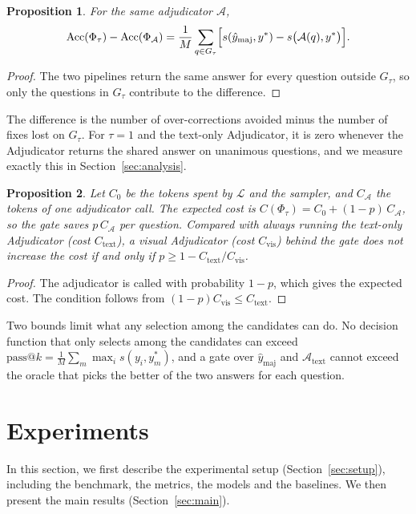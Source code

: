 \documentclass[pdflatex,sn-basic]{sn-jnl}%
\theoremstyle{thmstyletwo}%
\newtheorem{proposition}{Proposition}%
\begin{document}
\begin{proposition}
\label{prop:acc}
For the same adjudicator $\mathcal{A}$,
\[
\mathrm{Acc}(\Phi_\tau)-\mathrm{Acc}(\Phi_{\mathcal{A}})=\frac{1}{M}\sum_{q\in G_\tau}\Bigl[s(\hat y_{\mathrm{maj}},y^\ast)-s\bigl(\mathcal{A}(q),y^\ast\bigr)\Bigr].
\]
\end{proposition}
\begin{proof}
The two pipelines return the same answer for every question outside $G_\tau$, so only the questions in $G_\tau$ contribute to the difference.
\end{proof}

The difference is the number of over-corrections avoided minus the number of fixes lost on $G_\tau$. For $\tau=1$ and the text-only Adjudicator, it is zero whenever the Adjudicator returns the shared answer on unanimous questions, and we measure exactly this in Section~\ref{sec:analysis}.

\begin{proposition}
\label{prop:cost}
Let $C_0$ be the tokens spent by $\mathcal{L}$ and the sampler, and $C_{\mathcal{A}}$ the tokens of one adjudicator call. The expected cost is $C(\Phi_\tau)=C_0+(1-p)\,C_{\mathcal{A}}$, so the gate saves $p\,C_{\mathcal{A}}$ per question. Compared with always running the text-only Adjudicator (cost $C_{\mathrm{text}}$), a visual Adjudicator (cost $C_{\mathrm{vis}}$) behind the gate does not increase the cost if and only if $p\ge 1-C_{\mathrm{text}}/C_{\mathrm{vis}}$.
\end{proposition}
\begin{proof}
The adjudicator is called with probability $1-p$, which gives the expected cost. The condition follows from $(1-p)C_{\mathrm{vis}}\le C_{\mathrm{text}}$.
\end{proof}

Two bounds limit what any selection among the candidates can do. No decision function that only selects among the candidates can exceed $\mathrm{pass@}k=\frac{1}{M}\sum_m\max_i s(y_i,y^\ast_m)$, and a gate over $\hat y_{\mathrm{maj}}$ and $\mathcal{A}_{\mathrm{text}}$ cannot exceed the oracle that picks the better of the two answers for each question.

\section{Experiments}
\label{sec:experiments}

In this section, we first describe the experimental setup (Section~\ref{sec:setup}), including the benchmark, the metrics, the models and the baselines. We then present the main results (Section~\ref{sec:main}).
\end{document}
